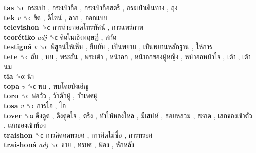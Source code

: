 \textbf{tas} ␝ϲ   กระเป๋า ,  กระเป๋าถือ ,  กระเป๋าถือสตรี ,  กระเป๋าเดินทาง ,  ถุง   \\
\textbf{tek} \emph{v}  ␝ϲ   ขีด ,  ดีไซน์ ,  ลาก ,  ออกแบบ   \\
\textbf{televishon} ␝ϲ   การถ่ายทอดโทรทัศน์ ,  การแพร่ภาพ   \\
\textbf{teorétiko} \emph{adj}  ␝ϲ   คิดในเชิงทฤษฏี ,  สกัด   \\
\textbf{testiguá} \emph{v}  ␝ϲ   พิสูจน์ให้เห็น ,  ยืนยัน ,  เป็นพยาน ,  เป็นพยานหลักฐาน ,  ให้การ   \\
\textbf{tete} ␝ϲ   ถัน ,  นม ,  พระถัน ,  พระเต้า ,  หน้าอก ,  หน้าอกของผู้หญิง ,  หน้าอกหน้าใจ ,  เต้า ,  เต้านม   \\
\textbf{tia} ␝α   น้า   \\
\textbf{topa} \emph{v}  ␝ϲ   พบ ,  พบโดยบังเอิญ   \\
\textbf{toro} ␝ϲ   พ่อวัว ,  วัวตัวผู้ ,  วัวเพศผู้   \\
\textbf{tosa} \emph{v}  ␝ϲ   การไอ ,  ไอ   \\
\textbf{tover} ␝α   ดึงดูด ,  ดึงดูดใจ ,  ตรึง ,  ทำให้หลงใหล ,  มีเสน่ห์ ,  สอยหลวม ,  สะกด ,  เสกของเข้าตัว ,  เสกของเข้าท้อง   \\
\textbf{traishon} ␝ϲ   การคิดคดทรยศ ,  การคิดไม่ซื่อ ,  การทรยศ   \\
\textbf{traishoná} \emph{adj}  ␝ϲ   ขาย ,  ทรยศ ,  ฟ้อง ,  หักหลัง   \\
